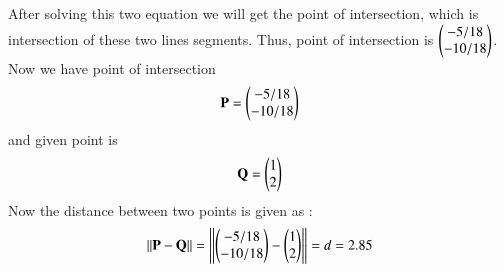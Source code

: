 After solving this two equation we will get the  point of intersection, which is intersection of these two lines segments.
Thus, point of intersection is $\begin{pmatrix}-5/18 \\ -10/18 \\ \end{pmatrix} $.
Now we have point of intersection
\begin{align}
 \mathbf{P} = 
\begin{pmatrix}
-5/18\\
-10/18 \\	
\end{pmatrix}
\end{align}
and given point is
\begin{align}
\mathbf{Q}   = 
\begin{pmatrix}
1\\
2 \\	
\end{pmatrix} 
\end{align}
Now  the distance between two points is given as :
\begin{align}
\left\lVert
\mathbf{P} - \mathbf{Q}
\right\rVert = 
\left\lVert
\begin{pmatrix}
-5/18\\ 
-10/18 \\
\end{pmatrix}
-  \begin{pmatrix}
1\\ 
2 \\
\end{pmatrix} \right\rVert= d = 2.85 
\end{align}

